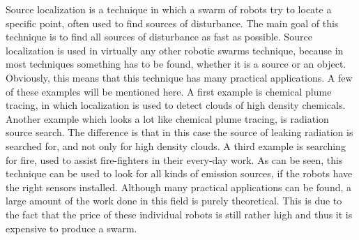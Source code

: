 
Source localization is a technique in which a swarm of robots try to locate a specific point, often used to find sources of disturbance. 
The main goal of this technique is to find all sources of disturbance as fast as possible. 
Source localization is used in virtually any other robotic swarms technique, because in most techniques something has to be found, whether it is a source or an object. \\

Obviously, this means that this technique has many practical applications.
A few of these examples will be mentioned here. 
A first example is chemical plume tracing, in which localization is used to detect clouds of high density chemicals. \cite{zarzhitsky2005distributed}
Another example which looks a lot like chemical plume tracing, is radiation source search. \cite{bashyal2008human} The difference is that in this case the source of leaking radiation is searched for, and not only for high density clouds. 
A third example is searching for fire, used to assist fire-fighters in their every-day work. \cite{marjovi2009multi}
As can be seen, this technique can be used to look for all kinds of emission sources, if the robots have the right sensors installed. \cite{cui2004swarm}
Although many practical applications can be found, a large amount of the work done in this field is purely theoretical.
This is due to the fact that the price of these individual robots is still rather high and thus it is expensive to produce a swarm.


